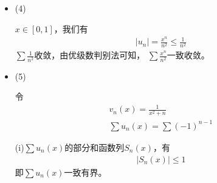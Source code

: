 \documentclass{article}
\begin{document}
\begin{itemize}
        考虑$x \neq 0$时，
        \begin{align*}
          |v_n(x) - f(x)|
           & = \left|\frac{x^2}{(1 + x^2)^n} - 0\right| \\
           & = \left|\frac{x^2}{(1 + x^2)^n}\right|     \\
           & \leq \frac{x^2}{1 + n x^2}                 \\
           & = \frac{1}{\frac{1}{x^2} + n}              \\
           & \leq \frac{1}{n}
        \end{align*}
        注：第一个不等式可以使用二次项展开得到。

        $x = 0$时，$|v_n(x) - f(x)| = 0 < \frac{1}{n}$；所以
        \begin{align*}
          \sup\limits_{x \in (-\infty, \infty)} |v_n(x) - f(x)| \leq \frac{1}{n}
        \end{align*}
        又有
        \begin{align*}
          \lim\limits_{n \to \infty} \sup\limits_{x \in (-\infty, \infty)} |v_n(x) - f(x)|
           & = \lim\limits_{n \to \infty} \frac{1}{n} \\
           & = 0
        \end{align*}
        所以，$v_n(x) \rightrightarrows 0$。

        综上，使用$A-D$判别法，函数项级数$\sum \frac{(-1)^{n - 1}x^2}{(1 + x^2)^n}$一致收敛。

  \item (4)

        $x \in [0, 1]$，我们有
        \begin{align*}
          |u_n| = \frac{x^n}{n^2} \leq \frac{1}{n^2}
        \end{align*}
        $\sum \frac{1}{n^2}$收敛，由优级数判别法可知，
        $\sum \frac{x^n}{n^2}$一致收敛。

  \item (5)

        令
        \begin{align*}
          v_n(x) = \frac{1}{x^2 + n} \\
          \sum u_n(x) = \sum (-1)^{n - 1}
        \end{align*}

        (i)$\sum u_n(x)$的部分和函数列$S_n(x)$，有
        \begin{align*}
          |S_n(x)| \leq 1
        \end{align*}
        即$\sum u_n(x)$一致有界。


\end{itemize}
\end{document}
